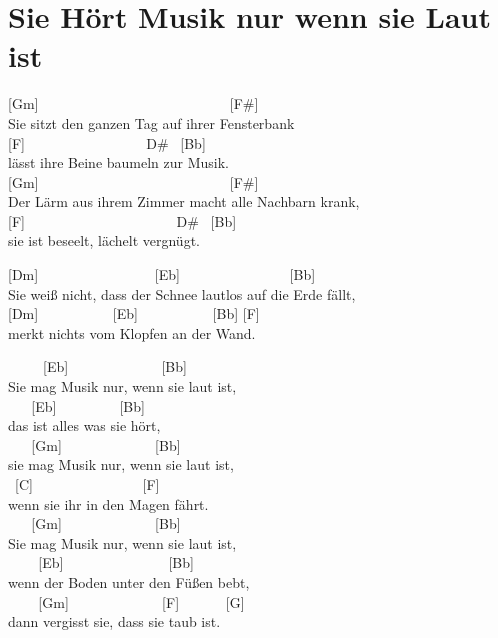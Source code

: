 \documentclass[
  letterpaper,
]{scrbook}
\begin{document}
\hypertarget{sie-huxf6rt-musik-nur-wenn-sie-laut-ist}{%
\chapter{Sie Hört Musik nur wenn sie Laut
ist}\label{sie-huxf6rt-musik-nur-wenn-sie-laut-ist}}

{[}Gm{]} ~ ~ ~ ~ ~ ~ ~ ~ ~ ~ ~ ~ ~ ~ ~ ~ {[}F\#{]}\\
Sie sitzt den ganzen Tag auf ihrer Fensterbank\\
{[}F{]} ~ ~ ~ ~ ~ ~ ~ ~ ~ ~ D\# ~{[}Bb{]}\\
lässt ihre Beine baumeln zur Musik.\\
{[}Gm{]} ~ ~ ~ ~ ~ ~ ~ ~ ~ ~ ~ ~ ~ ~ ~ ~ {[}F\#{]}\\
Der Lärm aus ihrem Zimmer macht alle Nachbarn krank,\\
{[}F{]} ~ ~ ~ ~ ~ ~ ~ ~ ~ ~ ~ ~ ~D\# ~{[}Bb{]}\\
sie ist beseelt, lächelt vergnügt.

{[}Dm{]} ~ ~ ~ ~ ~ ~ ~ ~ ~ ~{[}Eb{]} ~ ~ ~ ~ ~ ~ ~ ~ ~ {[}Bb{]}\\
Sie weiß nicht, dass der Schnee lautlos auf die Erde fällt,\\
{[}Dm{]} ~ ~ ~ ~ ~ ~ {[}Eb{]} ~ ~ ~ ~ ~ ~ {[}Bb{]} {[}F{]}\\
merkt nichts vom Klopfen an der Wand.

~ ~ ~ {[}Eb{]} ~ ~ ~ ~ ~ ~ ~ ~{[}Bb{]}\\
Sie mag Musik nur, wenn sie laut ist,\\
\hspace*{0.333em} ~ ~ {[}Eb{]} ~ ~ ~ ~ ~ {[}Bb{]}\\
das ist alles was sie hört,\\
\hspace*{0.333em} ~ ~ {[}Gm{]} ~ ~ ~ ~ ~ ~ ~ ~{[}Bb{]}\\
sie mag Musik nur, wenn sie laut ist,\\
\hspace*{0.333em} ~{[}C{]} ~ ~ ~ ~ ~ ~ ~ ~ ~ {[}F{]}\\
wenn sie ihr in den Magen fährt.\\
\hspace*{0.333em} ~ ~ {[}Gm{]} ~ ~ ~ ~ ~ ~ ~ ~{[}Bb{]}\\
Sie mag Musik nur, wenn sie laut ist,\\
\hspace*{0.333em} ~ ~ ~{[}Eb{]} ~ ~ ~ ~ ~ ~ ~ ~ ~{[}Bb{]}\\
wenn der Boden unter den Füßen bebt,\\
\hspace*{0.333em} ~ ~ ~{[}Gm{]} ~ ~ ~ ~ ~ ~ ~ ~{[}F{]} ~ ~ ~ ~{[}G{]}\\
dann vergisst sie, dass sie taub ist.
\end{document}
